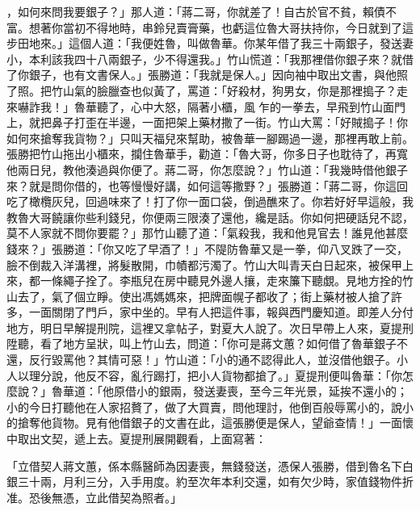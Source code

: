 \begin{showcontents}{}
，如何來問我要銀子？」那人道：「蔣二哥，你就差了！自古於官不貧，賴債不富。想著你當初不得地時，串鈴兒賣膏藥，也虧這位魯大哥扶持你，今日就到了這步田地來。」這個人道：「我便姓魯，叫做魯華。你某年借了我三十兩銀子，發送妻小，本利該我四十八兩銀子，少不得還我。」竹山慌道：「我那裡借你銀子來？就借了你銀子，也有文書保人。」張勝道：「我就是保人。」因向袖中取出文書，與他照了照。把竹山氣的臉臘查也似黃了，罵道：「好殺材，狗男女，你是那裡搗子？走來嚇詐我！」魯華聽了，心中大怒，隔著小櫃，風乍的一拳去，早飛到竹山面門上，就把鼻子打歪在半邊，一面把架上藥材撒了一街。竹山大罵：「好賊搗子！你如何來搶奪我貨物？」只叫天福兒來幫助，被魯華一腳踢過一邊，那裡再敢上前。張勝把竹山拖出小櫃來，攔住魯華手，勸道：「魯大哥，你多日子也耽待了，再寬他兩日兒，教他湊過與你便了。蔣二哥，你怎麼說？」竹山道：「我幾時借他銀子來？就是問你借的，也等慢慢好講，如何這等撒野？」張勝道：「蔣二哥，你這回吃了橄欖灰兒，回過味來了！打了你一面口袋，倒過醮來了。你若好好早這般，我教魯大哥饒讓你些利錢兒，你便兩三限湊了還他，纔是話。你如何把硬話兒不認，莫不人家就不問你要罷？」那竹山聽了道：「氣殺我，我和他見官去！誰見他甚麼錢來？」張勝道：「你又吃了早酒了！」不隄防魯華又是一拳，仰八叉跌了一交，臉不倒裁入洋溝裡，將髮散開，巾幘都污濁了。竹山大叫青天白日起來，被保甲上來，都一條繩子拴了。李瓶兒在房中聽見外邊人攘，走來簾下聽覷。見地方拴的竹山去了，氣了個立睜。使出馮媽媽來，把牌面幌子都收了；街上藥材被人搶了許多，一面關閉了門戶，家中坐的。早有人把這件事，報與西門慶知道。即差人分付地方，明日早解提刑院，這裡又拿帖子，對夏大人說了。次日早帶上人來，夏提刑陞聽，看了地方呈狀，叫上竹山去，問道：「你可是蔣文蕙？如何借了魯華銀子不還，反行毀罵他？其情可惡！」竹山道：「小的通不認得此人，並沒借他銀子。小人以理分說，他反不容，亂行踢打，把小人貨物都搶了。」夏提刑便叫魯華：「你怎麼說？」魯華道：「他原借小的銀兩，發送妻喪，至今三年光景，延挨不還小的；小的今日打聽他在人家招贅了，做了大買賣，問他理討，他倒百般辱罵小的，說小的搶奪他貨物。見有他借銀子的文書在此，這張勝便是保人，望爺查情！」一面懷中取出文契，遞上去。夏提刑展開觀看，上面寫著：

「立借契人蔣文蕙，係本縣醫師為因妻喪，無錢發送，憑保人張勝，借到魯名下白銀三十兩，月利三分，入手用度。約至次年本利交還，如有欠少時，家值錢物件折准。恐後無憑，立此借契為照者。」


\end{showcontents}
